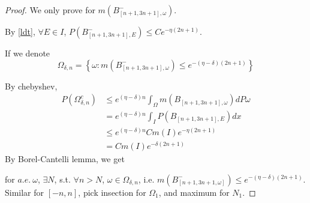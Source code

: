 \begin{proof}
  We only prove for $m(B_{[n+1,3n+1],\omega}^-)$.

  By \eqref{ldt}, $\forall E\in I$, $P(B_{[n+1,3n+1],E}^-)\leq Ce^{-\eta(2n+1)}$.

  If we denote
    \[
      \Omega_{\delta,n}=\left\{\omega:m(B_{[n+1,3n+1],\omega}^-)\leq e^{-(\eta-\delta)(2n+1)}\right\}
    \]

  By chebyshev,
  \[
    \begin{aligned}
      P(\Omega_{\delta,n}^c)
      &\leq e^{(\eta-\delta)n}\int_{\Omega} m(B_{[n+1,3n+1],\omega})dP\omega\\
      &=    e^{(\eta-\delta)n}\int_I P(B_{[n+1,3n+1],E})dx\\
      &\leq e^{(\eta-\delta)n}Cm(I)e^{-\eta(2n+1)}\\
      &=Cm(I)e^{-\delta(2n+1)}
    \end{aligned}
  \]
By Borel-Cantelli lemma, we get

for $a.e.~\omega$, $\exists N$, s.t. $\forall n>N$, $\omega\in\Omega_{\delta,n}$, i.e. $m(B_{[n+1,3n+1,\omega]}^-)\leq e^{-(\eta-\delta)(2n+1)}.$
Similar for $[-n,n]$, pick insection for $\Omega_1$, and maximum for $N_1$.
\end{proof}

